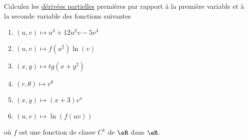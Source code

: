 
\begin{exercice}\label{exo0049}

	Calculez les \href{http://abstrusegoose.com/26}{dérivées partielles} premières par rapport à la première variable et à la seconde variable des fonctions suivantes
\begin{multicols}{2}
\begin{enumerate}
\item $(u,v) \mapsto u^3+12u^2v -5v^3 $
\item $(u,v) \mapsto f(u^2)\ln(v) $
\item $(x,y) \mapsto tg(x+y^2) $
\item $(r,\theta) \mapsto r^\theta $
\item $(x,y) \mapsto (x+3)e^x $
\item $(u,v) \mapsto \ln(f(uv)) $
\end{enumerate}
\end{multicols}
où $f$ est une fonction de classe $C^1$ de $\eR$ dans $\eR$.

\end{exercice}
